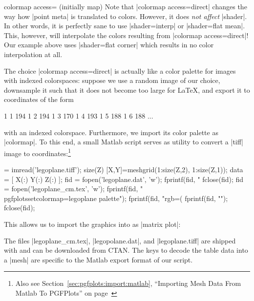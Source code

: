 \begin{pgfplotskey}{colormap access= (initially map)%
}
    Note that |colormap access=direct| changes the way how |point meta| is
    translated to colors. However, it does \emph{not affect} |shader|. In other
    words, it is perfectly sane to use |shader=interp| or |shader=flat mean|.
    This, however, will interpolate the colors resulting from
    |colormap access=direct|! Our example above uses |shader=flat corner| which
    results in no color interpolation at all.

    The choice |colormap access=direct| is actually like a color palette for
    images with indexed colorspaces: suppose we use a random image of our choice,
	downsample it such that it does not become too large for \LaTeX, and export it to
    coordinates of the form
\begin{codeexample}
1 1 194
1 2 194
1 3 170
1 4 193
1 5 188
1 6 188
...
\end{codeexample}
    with an indexed colorspace. Furthermore, we import its color palette as
    \PGFPlots{} |colormap|. To this end, a small Matlab script serves as
    utility to convert a |tiff| image to coordinates:\footnote{Also see
    Section~\ref{sec:pgfplots:import:matlab}, ``Importing Mesh Data From Matlab
    To PGFPlots'' on page~\pageref{sec:pgfplots:import:matlab}}
\begin{codeexample} = imread('legoplane.tiff');
size(Z)
[X,Y]=meshgrid(1:size(Z,2), 1:size(Z,1));
data = [ X(:) Y(:) Z(:) ];
fid = fopen('legoplane.dat', 'w');
fprintf(fid, "%
fclose(fid);
fid = fopen('legoplane_cm.tex', 'w');
fprintf(fid, "\\pgfplotsset{colormap={legoplane palette}{\n");
fprintf(fid, "rgb=(%
fprintf(fid, "}}\n");
fclose(fid);
\end{codeexample}
    This allows us to import the graphics into \PGFPlots{} as |matrix plot|:
%
\pgfplotsexpensiveexample
\begin{codeexample}[]
\end{codeexample}
    The files |legoplane_cm.tex|, |legopolane.dat|, and |legoplane.tiff| are shipped with \PGFPlots{} and can
    be downloaded from CTAN. The keys to decode the table data into a |mesh|
    are specific to the Matlab export format of our script.


\end{pgfplotskey}
